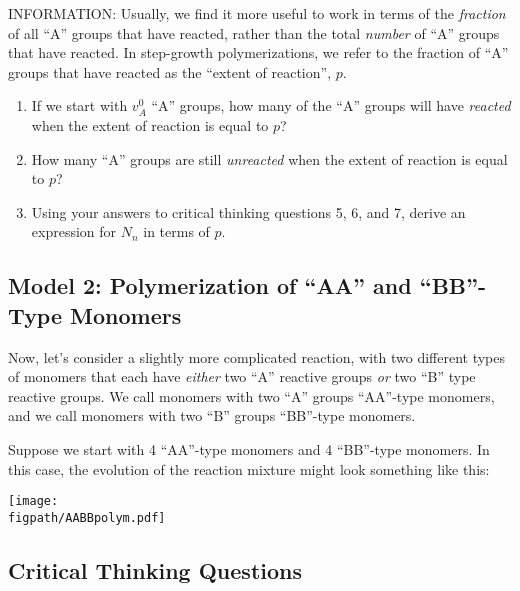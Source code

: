 	INFORMATION: Usually, we find it more useful to work in terms of the \emph{fraction} of all ``A'' groups that have reacted, rather than the total \emph{number} of ``A'' groups that have reacted.  In step-growth polymerizations, we refer to the fraction of ``A'' groups that have reacted as the ``extent of reaction'', $p$.
	
	\begin{enumerate}[resume]
		\item If we start with $v_A^0$ ``A'' groups, how many of the ``A'' groups will have \emph{reacted} when the extent of reaction is equal to $p$?
		
		\item How many ``A'' groups are still \emph{unreacted} when the extent of reaction is equal to $p$?
		
		\item Using your answers to critical thinking questions 5, 6, and 7, derive an expression for $N_n$ in terms of $p$.
		
	\end{enumerate}

\subsection{Model 2: Polymerization of ``AA'' and ``BB''-Type Monomers}

Now, let's consider a slightly more complicated reaction, with two different types of monomers that each have \emph{either} two ``A'' reactive groups \emph{or} two ``B'' type reactive groups.
We call monomers with two ``A'' groups ``AA''-type monomers, and we call monomers with two ``B'' groups ``BB''-type monomers.

Suppose we start with 4 ``AA''-type monomers and 4 ``BB''-type monomers.
In this case, the evolution of the reaction mixture might look something like this:

\vspace{0.1in}
\centerline{\texttt{[image: \\figpath/AABBpolym.pdf]}}

\subsection*{Critical Thinking Questions}

